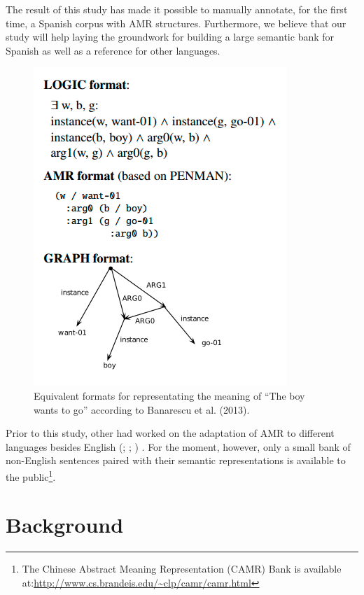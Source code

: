 \documentclass[10pt, a4paper]{article}
\begin{document}
The result of this study has made it possible to manually annotate, for the first time, a Spanish corpus with AMR structures. Furthermore, we believe that our study will help laying the groundwork for building a large semantic bank for Spanish as well as a reference for other languages.

\begin{figure}[!h]
\begin{center}
\includegraphics[scale=0.5]{banarescu-amr-example}
\caption{Equivalent formats for representating the meaning of
``The boy wants to go'' according to Banarescu et al. (2013).}
\label{fig:amr-example}
\end{center}
\end{figure}
Prior to this study, other had worked on the adaptation of AMR to different languages besides English (\cite{uresovaetal14}; \cite{lietal16};  \cite{xueetal14}) . For the moment, however, only a small bank of non-English sentences paired with their semantic representations is available to the public\footnote{The Chinese Abstract Meaning Representation (CAMR) Bank is available at:\url{http://www.cs.brandeis.edu/~clp/camr/camr.html}}.

\section{Background}\label{sec:background}
\end{document}
